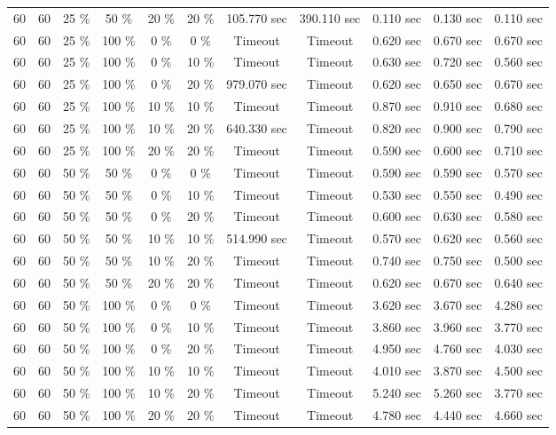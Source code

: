 \documentclass{article}
\begin{document}
\begin{longtable}[]{@{}ccccccccccc@{}}
60 & 60 & 25 \% & 50 \% & 20 \% & 20 \% & 105.770 sec & 390.110 sec & 0.110 sec & 0.130 sec & 0.110 sec \\
60 & 60 & 25 \% & 100 \% & 0 \% & 0 \% & Timeout & Timeout & 0.620 sec & 0.670 sec & 0.670 sec \\
60 & 60 & 25 \% & 100 \% & 0 \% & 10 \% & Timeout & Timeout & 0.630 sec & 0.720 sec & 0.560 sec \\
60 & 60 & 25 \% & 100 \% & 0 \% & 20 \% & 979.070 sec & Timeout & 0.620 sec & 0.650 sec & 0.670 sec \\
60 & 60 & 25 \% & 100 \% & 10 \% & 10 \% & Timeout & Timeout & 0.870 sec & 0.910 sec & 0.680 sec \\
60 & 60 & 25 \% & 100 \% & 10 \% & 20 \% & 640.330 sec & Timeout & 0.820 sec & 0.900 sec & 0.790 sec \\
60 & 60 & 25 \% & 100 \% & 20 \% & 20 \% & Timeout & Timeout & 0.590 sec & 0.600 sec & 0.710 sec \\
60 & 60 & 50 \% & 50 \% & 0 \% & 0 \% & Timeout & Timeout & 0.590 sec & 0.590 sec & 0.570 sec \\
60 & 60 & 50 \% & 50 \% & 0 \% & 10 \% & Timeout & Timeout & 0.530 sec & 0.550 sec & 0.490 sec \\
60 & 60 & 50 \% & 50 \% & 0 \% & 20 \% & Timeout & Timeout & 0.600 sec & 0.630 sec & 0.580 sec \\
60 & 60 & 50 \% & 50 \% & 10 \% & 10 \% & 514.990 sec & Timeout & 0.570 sec & 0.620 sec & 0.560 sec \\
60 & 60 & 50 \% & 50 \% & 10 \% & 20 \% & Timeout & Timeout & 0.740 sec & 0.750 sec & 0.500 sec \\
60 & 60 & 50 \% & 50 \% & 20 \% & 20 \% & Timeout & Timeout & 0.620 sec & 0.670 sec & 0.640 sec \\
60 & 60 & 50 \% & 100 \% & 0 \% & 0 \% & Timeout & Timeout & 3.620 sec & 3.670 sec & 4.280 sec \\
60 & 60 & 50 \% & 100 \% & 0 \% & 10 \% & Timeout & Timeout & 3.860 sec & 3.960 sec & 3.770 sec \\
60 & 60 & 50 \% & 100 \% & 0 \% & 20 \% & Timeout & Timeout & 4.950 sec & 4.760 sec & 4.030 sec \\
60 & 60 & 50 \% & 100 \% & 10 \% & 10 \% & Timeout & Timeout & 4.010 sec & 3.870 sec & 4.500 sec \\
60 & 60 & 50 \% & 100 \% & 10 \% & 20 \% & Timeout & Timeout & 5.240 sec & 5.260 sec & 3.770 sec \\
60 & 60 & 50 \% & 100 \% & 20 \% & 20 \% & Timeout & Timeout & 4.780 sec & 4.440 sec & 4.660 sec \\

\end{longtable}
\end{document}
